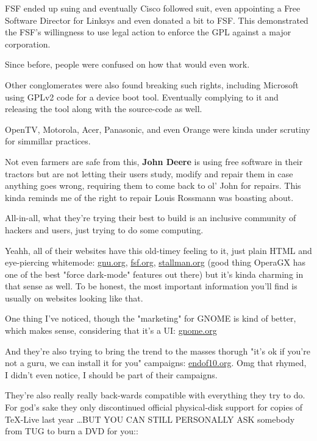 \documentclass[sigplan,screen]{acmart}
\begin{document}
FSF ended up suing and eventually Cisco followed suit, even appointing a Free Software Director for Linksys and even donated a bit to FSF. This demonstrated the FSF's willingness to use legal action to enforce the GPL against a major corporation. \cite{cisco-lawsuit-start} \cite{cisco-lawsuit-end}

Since before, people were confused on how that would even work. \cite{linksys-legend}

\par

Other conglomerates were also found breaking such rights, including Microsoft using GPLv2 code for a device boot tool. \cite{microsoft-steal-gpl} Eventually complying to it and releasing the tool along with the source-code as well.

OpenTV, Motorola, Acer, Panasonic, and even Orange were kinda under scrutiny for simmillar practices. \cite{orange-naughty}

Not even farmers are safe from this, \textbf{John Deere} is using free software in their tractors but are not letting their users study, modify and repair them in case anything goes wrong, requiring them to come back to ol' John for repairs. \cite{john-deere} This kinda reminds me of the right to repair
Louis Rossmann was boasting about. \cite{rossman-right-to-repair}

All-in-all, what they're trying their best to build is an inclusive community of hackers and users, just trying to do some computing.

Yeahh, all of their websites have this old-timey feeling to it, just plain HTML and eye-piercing whitemode: \href{https://www.gnu.org}{gnu.org}, \href{https://www.fsf.org}{fsf.org}, \href{https://www.stallman.org}{stallman.org} (good thing OperaGX has one of the best "force dark-mode" features out there)
but it's kinda charming in that sense as well. To be honest, the most important information you'll find is usually on websites looking like that.

One thing I've noticed, though the "marketing" for GNOME is kind of better, which makes sense, considering that it's a UI: \href{https://www.gnome.org}{gnome.org}

And they're also trying to bring the trend to the masses thorugh "it's ok if you're not a guru, we can install it for you" campaigns: \href{https://endof10.org/places/}{endof10.org}. Omg that rhymed, I didn't even notice, I should be part of their campaigns.

They're also really really back-wards compatible with everything they try to do. For god's sake they only discontinued official physical-disk support for copies of \TeX-Live last year \ldots BUT YOU CAN STILL PERSONALLY ASK somebody from TUG to burn a DVD for you:: \cite{texlive-on-dvd}
\end{document}
